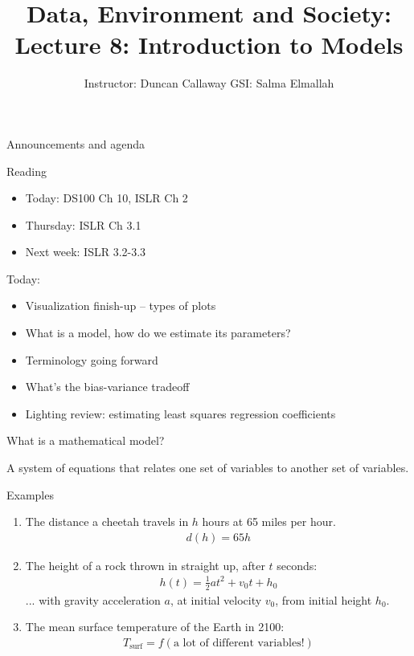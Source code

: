 \documentclass[aspectratio=169]{beamer}
\title[Lecture 8] %
{Data, Environment and Society: \\{Lecture 8: Introduction to Models}}
\author[ER131: Data, Environment and Society] 
{Instructor: Duncan Callaway \newline
GSI: Salma Elmallah}
\institute[UC Berkeley] %
 {\small{ \bf September 24, 2019}}
\date[September 24, 2019]
\begin{document}
\begin{frame}
  \titlepage
\end{frame}

\begin{frame}{Announcements and agenda}

Reading
\begin{itemize}
	\item Today: DS100 Ch 10, ISLR Ch 2
	\item Thursday: ISLR Ch 3.1
	\item Next week: ISLR 3.2-3.3
\end{itemize}

\vspace{5mm}

\pause

Today:
\begin{itemize}
	\item Visualization finish-up -- types of plots
	\item What is a model, how do we estimate its parameters?
	\item Terminology going forward
	\item What's the bias-variance tradeoff
	\item Lighting review: estimating least squares regression coefficients
\end{itemize}
\end{frame}

\begin{frame}{What is a mathematical model?}

\pause
A system of equations that relates one set of variables to another set of variables.
\pause
\hspace{5mm}

Examples

\begin{enumerate}
\item The distance a cheetah travels in $h$ hours at 65 miles per hour.
\begin{align*}
d(h) = 65 h
\end{align*}
 

\item The height of a rock thrown in straight up, after $t$ seconds:
\begin{align*}
h(t) = \frac{1}{2}a t^2 + v_0t + h_0
\end{align*}
... with gravity acceleration $a$, at initial velocity $v_0$, from initial height $h_0$.

\item The mean surface temperature of the Earth in 2100:
\begin{align*}
T_{\text{surf}} = f(\text{a lot of different variables!})
\end{align*}
\end{enumerate}

\end{frame}
\end{document}
